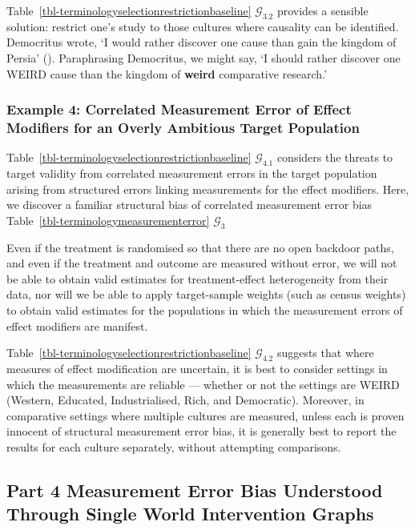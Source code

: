 \documentclass[
  single column]{article}
\begin{document}
Table~\ref{tbl-terminologyselectionrestrictionbaseline}
\(\mathcal{G}_{3.2}\) provides a sensible solution: restrict one's study
to those cultures where causality can be identified. Democritus wrote,
`I would rather discover one cause than gain the kingdom of Persia'
(). Paraphrasing
Democritus, we might say, `I should rather discover one WEIRD cause than
the kingdom of \textbf{weird} comparative research.'

\subsubsection{Example 4: Correlated Measurement Error of Effect
Modifiers for an Overly Ambitious Target
Population}\label{example-4-correlated-measurement-error-of-effect-modifiers-for-an-overly-ambitious-target-population}

Table~\ref{tbl-terminologyselectionrestrictionbaseline}
\(\mathcal{G}_{4.1}\) considers the threats to target validity from
correlated measurement errors in the target population arising from
structured errors linking measurements for the effect modifiers. Here,
we discover a familiar structural bias of correlated measurement error
bias Table~\ref{tbl-terminologymeasurementerror} \(\mathcal{G}_3\)

Even if the treatment is randomised so that there are no open backdoor
paths, and even if the treatment and outcome are measured without error,
we will not be able to obtain valid estimates for treatment-effect
heterogeneity from their data, nor will we be able to apply
target-sample weights (such as census weights) to obtain valid estimates
for the populations in which the measurement errors of effect modifiers
are manifest.

Table~\ref{tbl-terminologyselectionrestrictionbaseline}
\(\mathcal{G}_{4.2}\) suggests that where measures of effect
modification are uncertain, it is best to consider settings in which the
measurements are reliable --- whether or not the settings are WEIRD
(Western, Educated, Industrialised, Rich, and Democratic). Moreover, in
comparative settings where multiple cultures are measured, unless each
is proven innocent of structural measurement error bias, it is generally
best to report the results for each culture separately, without
attempting comparisons.

\subsection{Part 4 Measurement Error Bias Understood Through Single
World Intervention Graphs}\label{id-sec-4}
\end{document}
